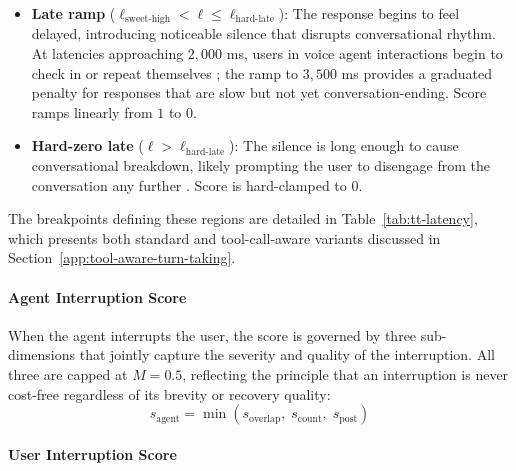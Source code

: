 \begin{itemize}[leftmargin=*, noitemsep]
\item \textbf{Late ramp} ($\ell_{\text{sweet-high}} < \ell \leq \ell_{\text{hard-late}}$): The response begins to feel delayed, introducing noticeable silence that disrupts conversational rhythm. At latencies approaching $2{,}000$ ms, users in voice agent 
interactions begin to check in or repeat themselves 
\citep{skantze2021turntaking, ward2005prosodic}; the ramp to 
$3{,}500$ ms provides a graduated penalty for responses that are 
slow but not yet conversation-ending. Score ramps linearly from $1$ to $0$.

\item \textbf{Hard-zero late} ($\ell > \ell_{\text{hard-late}}$): The silence is long enough to cause conversational breakdown, likely prompting the user to disengage from the conversation any further \cite{skantze2021turntaking}. Score is hard-clamped to $0$.
\end{itemize}



The breakpoints defining these regions are detailed in Table~\ref{tab:tt-latency}, which presents both standard and  tool-call-aware variants discussed in Section~\ref{app:tool-aware-turn-taking}. 

\paragraph{Agent Interruption Score}
When the agent interrupts the user, the score is governed by three sub-dimensions that jointly capture the severity and quality of the interruption. All three are capped at $M = 0.5$, reflecting the principle that an interruption is never cost-free regardless of its brevity or recovery quality:
%
\begin{equation}
    s_{\text{agent}} = \min\!\left(s_{\text{overlap}},\; 
    s_{\text{count}},\; s_{\text{post}}\right)
\end{equation}




\paragraph{User Interruption Score}

